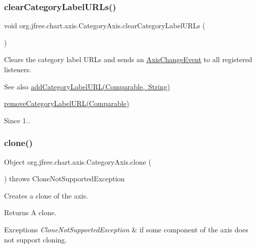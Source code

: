 \subsubsection{\texorpdfstring{clear\+Category\+Label\+U\+R\+Ls()}{clearCategoryLabelURLs()}}
{\footnotesize\ttfamily void org.\+jfree.\+chart.\+axis.\+Category\+Axis.\+clear\+Category\+Label\+U\+R\+Ls (\begin{DoxyParamCaption}{ }\end{DoxyParamCaption})}

Clears the category label U\+R\+Ls and sends an \mbox{\hyperlink{}{Axis\+Change\+Event}} to all registered listeners.

\begin{DoxySeeAlso}{See also}
\mbox{\hyperlink{classorg_1_1jfree_1_1chart_1_1axis_1_1_category_axis_a305f59a6b2cd0512e01e4b08de21d36b}{add\+Category\+Label\+U\+R\+L(\+Comparable, String)}} 

\mbox{\hyperlink{classorg_1_1jfree_1_1chart_1_1axis_1_1_category_axis_a37bd2f2448d6ba0903b8b4d0ee98adf4}{remove\+Category\+Label\+U\+R\+L(\+Comparable)}}
\end{DoxySeeAlso}
\begin{DoxySince}{Since}
1.. 
\end{DoxySince}
\mbox{\label{classorg_1_1jfree_1_1chart_1_1axis_1_1_category_axis_a12d8084f2602990fb74c11f58b18fb4c}} 
\subsubsection{\texorpdfstring{clone()}{clone()}}
{\footnotesize\ttfamily Object org.\+jfree.\+chart.\+axis.\+Category\+Axis.\+clone (\begin{DoxyParamCaption}{ }\end{DoxyParamCaption}) throws Clone\+Not\+Supported\+Exception}

Creates a clone of the axis.

\begin{DoxyReturn}{Returns}
A clone.
\end{DoxyReturn}

\begin{DoxyExceptions}{Exceptions}
{\em Clone\+Not\+Supported\+Exception} & if some component of the axis does not support cloning. \\
\hline
\end{DoxyExceptions}
\mbox{\label{classorg_1_1jfree_1_1chart_1_1axis_1_1_category_axis_aeba3de708fb4871055f2464b40ee582d}} 
